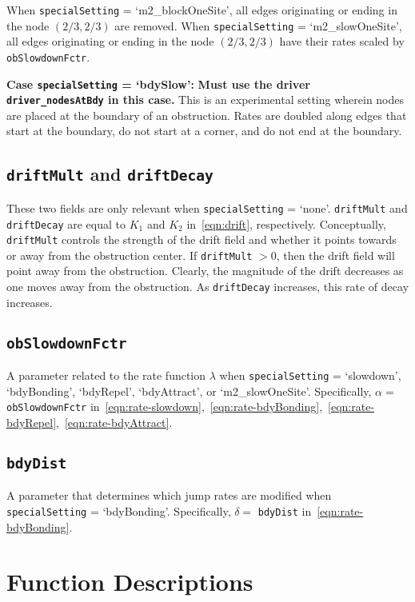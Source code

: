 \documentclass[11pt, oneside]{article}   	%
\theoremstyle{definition}
\begin{document}
When \texttt{specialSetting} = `m2\_blockOneSite', all edges originating or ending in the node $(2/3,2/3)$ are removed. When \texttt{specialSetting} = `m2\_slowOneSite', all edges originating or ending in the node $(2/3,2/3)$ have their rates scaled by \texttt{obSlowdownFctr}.

{\bf Case \texttt{specialSetting} = `bdySlow':} {\bf Must use the driver \texttt{driver\_nodesAtBdy} in this case.} This is an experimental setting wherein nodes are placed at the boundary of an obstruction. Rates are doubled along edges that start at the boundary, do not start at a corner, and do not end at the boundary.
 
\subsection{\texttt{driftMult} and \texttt{driftDecay}}
These two fields are only relevant when \texttt{specialSetting} = `none'. \texttt{driftMult} and \texttt{driftDecay} are equal to $K_1$ and $K_2$ in~\eqref{eqn:drift}, respectively. Conceptually, \texttt{driftMult} controls the strength of the drift field and whether it points towards or away from the obstruction center. If \texttt{driftMult} $> 0$, then the drift field will point away from the obstruction. Clearly, the magnitude of the drift decreases as one moves away from the obstruction. As \texttt{driftDecay} increases, this rate of decay increases.

\subsection{\texttt{obSlowdownFctr}}
A parameter related to the rate function $\lambda$ when \texttt{specialSetting} = `slowdown', `bdyBonding', `bdyRepel', `bdyAttract', or `m2\_slowOneSite'. Specifically, $\alpha = $ \texttt{obSlowdownFctr} in~\eqref{eqn:rate-slowdown},~\eqref{eqn:rate-bdyBonding},~\eqref{eqn:rate-bdyRepel},~\eqref{eqn:rate-bdyAttract}.

\subsection{\texttt{bdyDist}}
A parameter that determines which jump rates are modified when \texttt{specialSetting} = `bdyBonding'. Specifically, $\delta = $ \texttt{bdyDist} in~\eqref{eqn:rate-bdyBonding}.

\section{Function Descriptions}
\end{document}

